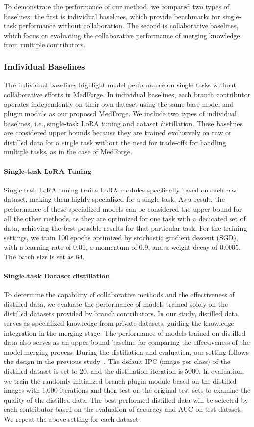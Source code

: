 To demonstrate the performance of our method, we compared two types of baselines: the first is individual baselines, which provide benchmarks for single-task performance without collaboration. The second is collaborative baselines, which focus on evaluating the collaborative performance of merging knowledge from multiple contributors.


\subsubsection{Individual Baselines}
The individual baselines highlight model performance on single tasks without collaborative efforts in MedForge. In individual baselines, each branch contributor operates independently on their own dataset using the same base model and plugin module as our proposed MedForge. We include two types of individual baselines, i.e., single-task LoRA tuning and dataset distillation. These baselines are considered upper bounds because they are trained exclusively on raw or distilled data for a single task without the need for trade-offs for handling multiple tasks, as in the case of MedForge.

\paragraph{Single-task LoRA Tuning}
Single-task LoRA tuning trains LoRA modules specifically based on each raw dataset, making them highly specialized for a single task. As a result, the performance of these specialized models can be considered the upper bound for all the other methods, as they are optimized for one task with a dedicated set of data, achieving the best possible results for that particular task. 
For the training settings, we train 100 epochs optimized by stochastic gradient descent (SGD), with a learning rate of 0.01, a momentum of 0.9, and a weight decay of 0.0005. The batch size is set as 64.

\paragraph{Single-task Dataset distillation}
To determine the capability of collaborative methods and the effectiveness of distilled data, we evaluate the performance of models trained solely on the distilled datasets provided by branch contributors. In our study, distilled data serves as specialized knowledge from private datasets, guiding the knowledge integration in the merging stage. The performance of models trained on distilled data also serves as an upper-bound baseline for comparing the effectiveness of the model merging process.
During the distillation and evaluation, our setting follows the design in the previous study~\cite{cazenavette2023glad}. The default IPC (image per class) of the distilled dataset is set to 20, and the distillation iteration is 5000. In evaluation, we train the randomly initialized branch plugin module based on the distilled images with 1,000 iterations and then test on the original test sets to examine the quality of the distilled data. The best-performed distilled data will be selected by each contributor based on the evaluation of accuracy and AUC on test dataset. We repeat the above setting for each dataset.

